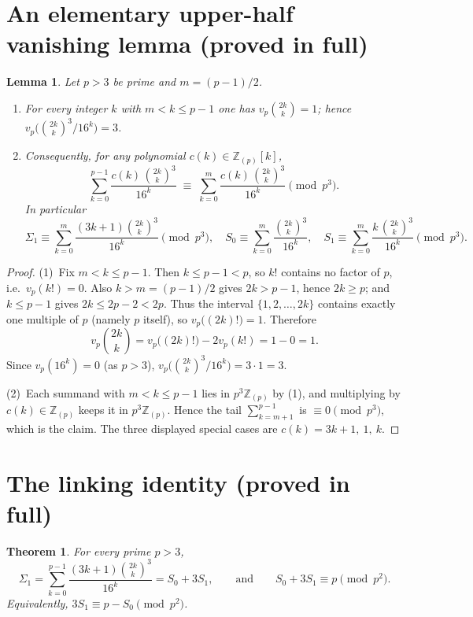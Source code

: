 \documentclass[12pt]{article}
\newtheorem{theorem}{Theorem}
\newtheorem{lemma}{Lemma}
\theoremstyle{remark}
\newcommand{\bin}[2]{\binom{#1}{#2}}
\begin{document}
\section{An elementary upper-half vanishing lemma (proved in full)}

\begin{lemma}\label{lem:upperhalf}
Let $p>3$ be prime and $m=(p-1)/2$.
\begin{enumerate}
\item For every integer $k$ with $m<k\le p-1$ one has $v_p\!\bin{2k}{k}=1$;
hence $v_p\!\bigl(\bin{2k}{k}^3/16^k\bigr)=3$.
\item Consequently, for any polynomial $c(k)\in\mathbb Z_{(p)}[k]$,
\[
\sum_{k=0}^{p-1}\frac{c(k)\,\bin{2k}{k}^3}{16^k}
\;\equiv\;\sum_{k=0}^{m}\frac{c(k)\,\bin{2k}{k}^3}{16^k}\pmod{p^3}.
\]
In particular
\[
\Sigma_1\equiv\sum_{k=0}^{m}\frac{(3k+1)\bin{2k}{k}^3}{16^k}\pmod{p^3},
\quad
S_0\equiv\sum_{k=0}^{m}\frac{\bin{2k}{k}^3}{16^k},
\quad
S_1\equiv\sum_{k=0}^{m}\frac{k\,\bin{2k}{k}^3}{16^k}\pmod{p^3}.
\]
\end{enumerate}
\end{lemma}

\begin{proof}
(1)\ Fix $m<k\le p-1$.  Then $k\le p-1<p$, so $k!$ contains no factor of $p$,
i.e.\ $v_p(k!)=0$.  Also $k>m=(p-1)/2$ gives $2k>p-1$, hence $2k\ge p$; and
$k\le p-1$ gives $2k\le2p-2<2p$.  Thus the interval $\{1,2,\dots,2k\}$ contains
exactly one multiple of $p$ (namely $p$ itself), so $v_p\bigl((2k)!\bigr)=1$.
Therefore
\[
v_p\!\bin{2k}{k}=v_p\bigl((2k)!\bigr)-2v_p(k!)=1-0=1 .
\]
Since $v_p(16^k)=0$ (as $p>3$), $v_p\!\bigl(\bin{2k}{k}^3/16^k\bigr)=3\cdot1=3$.

(2)\ Each summand with $m<k\le p-1$ lies in $p^3\mathbb Z_{(p)}$ by (1), and
multiplying by $c(k)\in\mathbb Z_{(p)}$ keeps it in $p^3\mathbb Z_{(p)}$.  Hence
the tail $\sum_{k=m+1}^{p-1}$ is $\equiv0\pmod{p^3}$, which is the claim.  The
three displayed special cases are $c(k)=3k+1,\ 1,\ k$.
\end{proof}

\section{The linking identity (proved in full)}

\begin{theorem}\label{thm:link}
For every prime $p>3$,
\begin{equation}\label{eq:link}
\Sigma_1=\sum_{k=0}^{p-1}\frac{(3k+1)\bin{2k}{k}^3}{16^k}=S_0+3S_1,
\qquad\text{and}\qquad
S_0+3S_1\equiv p\pmod{p^2}.
\end{equation}
Equivalently, $3S_1\equiv p-S_0\pmod{p^2}$.
\end{theorem}
\end{document}
